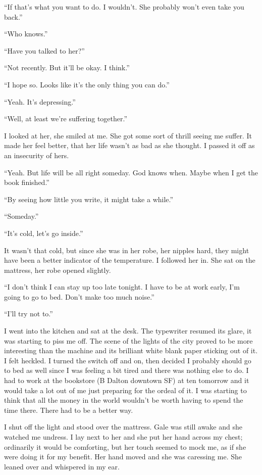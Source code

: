 ``If that's what you want to do. I wouldn't. She probably won't even
take you back.''

``Who knows.''

``Have you talked to her?''

``Not recently. But it'll be okay. I think.''

``I hope so. Looks like it's the only thing you can do.''

``Yeah. It's depressing.''

``Well, at least we're suffering together.''

I looked at her, she smiled at me. She got some sort of thrill seeing me
suffer. It made her feel better, that her life wasn't as bad as she
thought. I passed it off as an insecurity of hers.

``Yeah. But life will be all right someday. God knows when. Maybe when I
get the book finished.''

``By seeing how little you write, it might take a while.''

``Someday.''

``It's cold, let's go inside.''

It wasn't that cold, but since she was in her robe, her nipples hard,
they might have been a better indicator of the temperature. I followed
her in. She sat on the mattress, her robe opened slightly.

``I don't think I can stay up too late tonight. I have to be at work
early, I'm going to go to bed. Don't make too much noise.''

``I'll try not to.''

I went into the kitchen and sat at the desk. The typewriter resumed its
glare, it was starting to piss me off. The scene of the lights of the
city proved to be more interesting than the machine and its brilliant
white blank paper sticking out of it. I felt heckled. I turned the
switch off and on, then decided I probably should go to bed as well
since I was feeling a bit tired and there was nothing else to do. I had
to work at the bookstore (B Dalton downtown SF) at ten tomorrow and it
would take a lot out of me just preparing for the ordeal of it. I was
starting to think that all the money in the world wouldn't be worth
having to spend the time there. There had to be a better way.

I shut off the light and stood over the mattress. Gale was still awake
and she watched me undress. I lay next to her and she put her hand
across my chest; ordinarily it would be comforting, but her touch seemed
to mock me, as if she were doing it for my benefit. Her hand moved and
she was caressing me. She leaned over and whispered in my ear.

